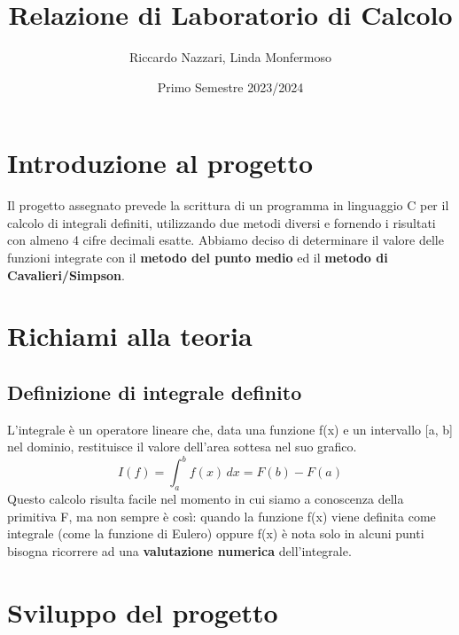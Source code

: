 \documentclass{article}
\title{Relazione di Laboratorio di Calcolo}
\author{Riccardo Nazzari, Linda Monfermoso}
\date{Primo Semestre 2023/2024}
\begin{document}
\maketitle

\section{Introduzione al progetto}
Il progetto assegnato prevede la scrittura di un programma in linguaggio C per il calcolo di integrali definiti,
utilizzando due metodi diversi e fornendo i risultati con almeno 4 cifre decimali esatte. Abbiamo deciso di determinare
il valore delle funzioni integrate con il \textbf{metodo del punto medio} ed il \textbf{metodo di Cavalieri/Simpson}.
\section{Richiami alla teoria}
\subsection{Definizione di integrale definito}
L'integrale è un operatore lineare che, data una funzione f(x) e un intervallo [a, b] nel dominio, restituisce il valore 
dell'area sottesa nel suo grafico. 
\begin{equation*}
   I(f) =  \int_{a}^{b} f(x)\, dx = F(b) - F(a)
\end{equation*}
Questo calcolo risulta facile nel momento in cui siamo a conoscenza della primitiva F, ma non sempre è così: quando la funzione
f(x) viene definita come integrale (come la funzione di Eulero) oppure f(x) è nota solo in alcuni punti bisogna ricorrere ad una 
\textbf{valutazione numerica} dell'integrale.
\section{Sviluppo del progetto}
\end{document}
